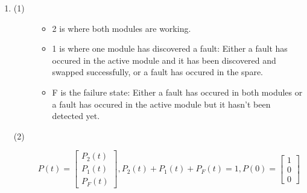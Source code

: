 \documentclass[a4paper,12pt]{article}
\begin{document}
\begin{enumerate}
        \item
            \begin{description}
                \item[(1)]
                    \begin{itemize}
                        \item 2 is where both modules are working.
                        \item 1 is where one module has discovered a fault: Either a fault has occured in the active module and it has been discovered and swapped successfully, or a fault has occured in the spare.
                        \item F is the failure state: Either a fault has occured in both modules or a fault has occured in the active module but it hasn't been detected yet.
                    \end{itemize}

                    \begin{center}
                    \end{center}

                \item[(2)] $P(t) = \begin{bmatrix} P_2(t) \\ P_1(t) \\ P_F(t) \end{bmatrix}, P_2(t) + P_1(t) + P_F(t) = 1, P(0) = \begin{bmatrix} 1 \\ 0 \\ 0 \end{bmatrix}$


\end{description}
\end{enumerate}
\end{document}
